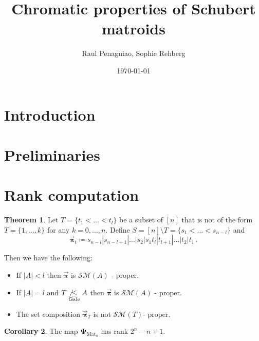 \documentclass[12pt]{amsart}
\theoremstyle{definition}
\newtheorem{thm}{Theorem}[section]
\newtheorem{cor}[thm]{Corollary}
\newcommand{\opi}{\vec{\boldsymbol{\pi}}}
\newcommand{\SM}{\mathcal S \mathcal M}
\newcommand{\leqG}{\underset{\text{Gale}}{\leq}}
\newcommand{\Mat}{\mathrm{Mat}}
\begin{document}
\title{Chromatic properties of Schubert matroids} %

\author{Raul Penaguiao, Sophie Rehberg}
\address{Max Planck Institute Leipzig, FU Berlin}
\keywords{}
\subjclass[2010]{}
\date{\today} %

\begin{abstract}

\end{abstract}

\maketitle
\section{Introduction}

\section{Preliminaries}


\section{Rank computation}



\begin{thm}
Let $T = \{t_1 < \dots < t_l\}$ be a subset of $[n]$ that is not of the form $T = \{1, \dots, k\}$ for any $k = 0, \dots, n$.
Define $S = [n] \setminus T = \{s_1 < \dots < s_{n-l}\}$ and 
$$ \opi_t \coloneqq s_{n-l} | s_{n-l+1} | \dots | s_2 | s_1 t_l | t_{l+1}| \dots |t_2 | t_1 \, .$$

Then we have the following:
\begin{itemize}
\item If $|A| < l$ then $\opi $ is $\SM (A)$ - proper.

\item If $|A| = l$ and $T \not\leqG A $ then $\opi$ is $\SM (A) $ - proper.

\item The set composition $\opi_T$ is not $\SM(T)$- proper.
\end{itemize}
\end{thm}


\begin{cor}
The map $\boldsymbol{\Psi}_{\Mat_n} $ has rank $2^n-n+1$.
\end{cor}





\end{document}
